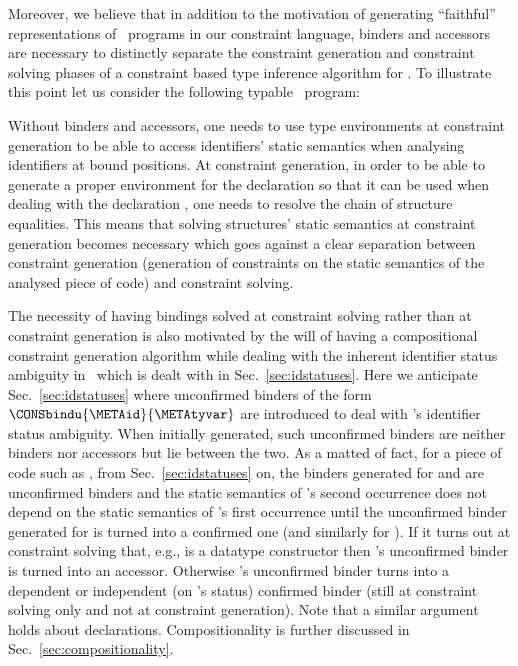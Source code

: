 \documentclass{jfp1}
\begin{document}
Moreover, we believe that in addition to the motivation of generating
``faithful'' representations of \SML\ programs in our constraint
language, binders and accessors are necessary to distinctly separate
the constraint generation and constraint solving phases of a
constraint based type inference algorithm for \SML.  To illustrate this
point let us consider the following typable \SML\ program:


Without binders and accessors, one needs to use type environments at
constraint generation to be able to access identifiers' static
semantics when analysing identifiers at bound positions.  At
constraint generation, in order to be able to generate a proper
environment for the declaration  so that it can
be used when dealing with the declaration , one needs to resolve the chain of structure equalities.  This
means that solving structures' static semantics at constraint
generation becomes necessary which goes against a clear separation
between constraint generation (generation of constraints on the static
semantics of the analysed piece of code) and constraint solving.

The necessity of having bindings solved at constraint solving rather
than at constraint generation is also motivated by the will of having
a compositional constraint generation algorithm while dealing with the
inherent identifier status ambiguity in \SML\ which is dealt with in
Sec.~\ref{sec:idstatuses}.
%
Here we anticipate Sec.~\ref{sec:idstatuses} where unconfirmed binders
of the form $\CONSbindu{\METAid}{\METAtyvar}$ are introduced to deal
with \SML's identifier status ambiguity.  When initially generated,
such unconfirmed binders are neither binders nor accessors but lie
between the two.
%
As a matted of fact, for a piece of code such as
, from Sec.~\ref{sec:idstatuses}
on, the binders generated for
 and  are unconfirmed binders and the
static semantics of 's second occurrence does not
depend on the static semantics of 's first occurrence
until the unconfirmed binder generated for  is turned
into a confirmed one
(and similarly for ).  If it turns out at constraint
solving that, e.g.,  is a datatype constructor then
's unconfirmed binder is turned into an accessor.
Otherwise 's unconfirmed
binder turns into a dependent or independent (on 's
status) confirmed binder (still at constraint solving only and not at
constraint generation).
%
Note that a similar argument holds about 
declarations.
%
Compositionality is further discussed in
Sec.~\ref{sec:compositionality}.
\end{document}
